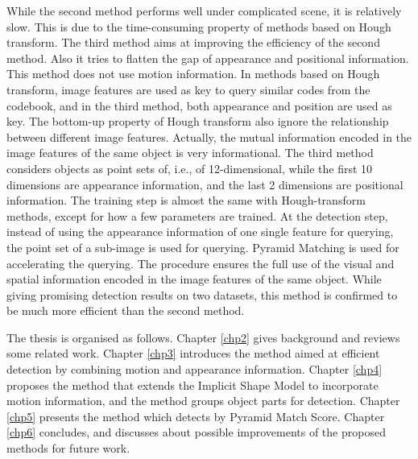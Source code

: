 While the second method performs well under complicated scene, it is relatively slow. This is due to the time-consuming property of methods based on Hough transform.   The third method aims at improving the efficiency of the second method. Also it tries to flatten the gap of appearance and positional information. This method does not use motion information. In methods based on Hough transform, image features are used as key to query similar codes from the codebook, and in the third method, both appearance and position are used as key. The bottom-up property of Hough transform also ignore the relationship between different image features. Actually, the mutual information encoded in the image features of the same object is very informational. The third method considers objects as point sets of, i.e., of 12-dimensional, while the first 10 dimensions are appearance information, and the last 2 dimensions are positional information. The training step is almost the same with Hough-transform methods, except for how a few parameters are trained. At the detection step, instead of using the appearance information of one single feature for querying, the point set of a sub-image is used for querying. Pyramid Matching is used for accelerating the querying. The procedure ensures the full use of the visual and spatial  information encoded in the image features of the same object. While giving promising detection results on two datasets, this method is confirmed to be much more efficient than the second method.

The thesis is organised as follows. Chapter \ref{chp2} gives background and reviews some related work. Chapter \ref{chp3} introduces the method aimed at efficient detection by combining motion and appearance information. Chapter \ref{chp4} proposes the method that extends the Implicit Shape Model to incorporate motion information, and the method groups object parts for detection. Chapter \ref{chp5} presents the method which detects by Pyramid Match Score. Chapter \ref{chp6} concludes, and discusses about possible improvements of the proposed methods for future work.



